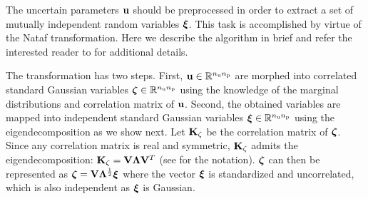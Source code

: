 The uncertain parameters $\mathbf{u}$ should be preprocessed in order to extract a set of mutually independent random variables $\bm{\xi}$.
This task is accomplished by virtue of the Nataf transformation.
Here we describe the algorithm in brief and refer the interested reader to \cite{li2008} for additional details.

The transformation has two steps.
First, $\mathbf{u} \in \mathbb{R}^{{n_\text{u}} {n_\text{p}}}$ are morphed into correlated standard Gaussian variables $\bm{\zeta} \in \mathbb{R}^{{n_\text{u}} {n_\text{p}}}$ using the knowledge of the marginal distributions and correlation matrix of $\mathbf{u}$.
Second, the obtained variables are mapped into independent standard Gaussian variables $\bm{\xi} \in \mathbb{R}^{{n_\text{u}} {n_\text{p}}}$ using the eigendecomposition as we show next.
Let $\mathbf{K}_\zeta$ be the correlation matrix of $\bm{\zeta}$.
Since any correlation matrix is real and symmetric, $\mathbf{K}_\zeta$ admits the eigendecomposition: $\mathbf{K}_\zeta = \mathbf{V} \mathbf{\Lambda} \mathbf{V}^T$ (see  for the notation).
$\bm{\zeta}$ can then be represented as $\bm{\zeta} = \mathbf{V} \mathbf{\Lambda}^\frac{1}{2} \bm{\xi}$ where the vector $\bm{\xi}$ is standardized and uncorrelated, which is also independent as $\bm{\xi}$ is Gaussian.

